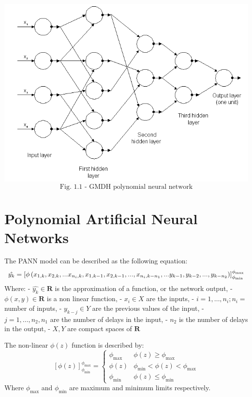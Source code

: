 \documentclass[conference,final,]{IEEEtran}
\makeatletter
\def\maxwidth{\ifdim\Gin@nat@width>\linewidth\linewidth
\else\Gin@nat@width\fi}
\let\Oldincludegraphics\includegraphics
\renewcommand{\includegraphics}[1]{\Oldincludegraphics[width=\maxwidth]{#1}}
\makeatother
\begin{document}
\includegraphics{../Figures/gmdh.png} \[
\text{Fig. 1.1 - GMDH polynomial neural network}
\]

\hypertarget{polynomial-artificial-neural-networks}{%
\section{Polynomial Artificial Neural
Networks}\label{polynomial-artificial-neural-networks}}

The PANN model can be described as the following equation: \[
\hat{y_k}= \left[\phi\left(x_{1,k}, x_{2,k}, ...x_{n_i, k}, x_{1, k-1}, x_{2, k-1}, ..., x_{n_i, k-n_1},
\\ ... y_{k-1}, y_{k-2}, ..., y_{k-n_2}\right)\right]_{\phi _\text{min}}^{\phi_\text{max}}
\] Where: - \(\hat{y_k} \in \mathbf{R}\) is the approximation of a
function, or the network output, - \(\phi(x,y) \in \mathbf{R}\) is a non
linear function, - \(x_i \in X\) are the inputs, -
\(i = 1, \ldots, n_i ; n_i =\) number of inputs, - \(y_{k-j} \in Y\) are
the previous values of the input, - \(j=1,\ldots,n_2,n_1\) are the
number of delays in the input, - \(n_2\) is the number of delays in the
output, - \(X,Y\) are compact spaces of \(\mathbf{R}\)

The non-linear \(\phi(z)\) function is described by: \[
\left[\phi(z)\right]_{\phi_\text{min}}^{\phi_\text{max}} =
\begin{cases}
  \phi_\text{max} & \phi(z) \ge \phi_\text{max} \\
  \phi(z) & \phi_\text{min} < \phi(z) < \phi_\text{max} \\
  \phi_\text{min} & \phi(z) \le \phi_\text{min}
\end{cases}
\] Where \(\phi_\text{max}\) and \(\phi_\text{min}\) are maximum and
minimum limits respectively.
\end{document}
